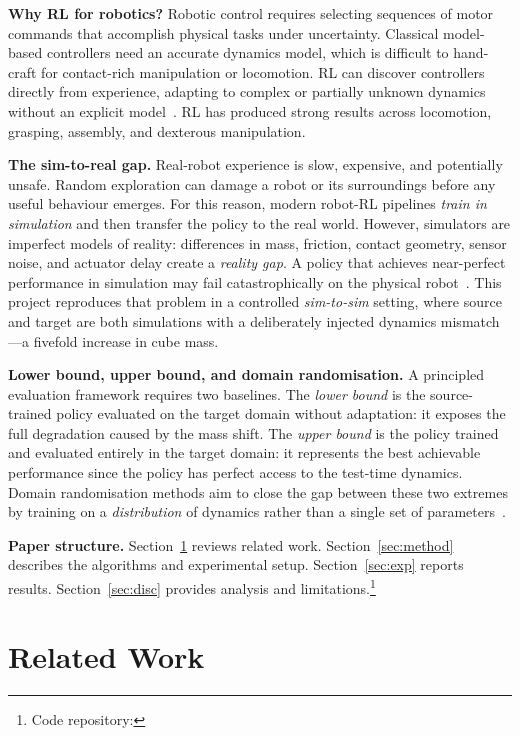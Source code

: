 \documentclass[10pt,twocolumn,letterpaper]{article}
\begin{document}
\textbf{Why RL for robotics?}
Robotic control requires selecting sequences of motor commands that accomplish physical tasks under uncertainty. Classical model-based controllers need an accurate dynamics model, which is difficult to hand-craft for contact-rich manipulation or locomotion. RL can discover controllers directly from experience, adapting to complex or partially unknown dynamics without an explicit model~\cite{kober2013robotics,kormushev2013applications}. RL has produced strong results across locomotion, grasping, assembly, and dexterous manipulation.

\textbf{The sim-to-real gap.}
Real-robot experience is slow, expensive, and potentially unsafe. Random exploration can damage a robot or its surroundings before any useful behaviour emerges. For this reason, modern robot-RL pipelines \emph{train in simulation} and then transfer the policy to the real world. However, simulators are imperfect models of reality: differences in mass, friction, contact geometry, sensor noise, and actuator delay create a \emph{reality gap}. A policy that achieves near-perfect performance in simulation may fail catastrophically on the physical robot~\cite{hofer2021perspectives,peng2018sim}. This project reproduces that problem in a controlled \emph{sim-to-sim} setting, where source and target are both simulations with a deliberately injected dynamics mismatch---a fivefold increase in cube mass.

\textbf{Lower bound, upper bound, and domain randomisation.}
A principled evaluation framework requires two baselines. The \emph{lower bound} is the source-trained policy evaluated on the target domain without adaptation: it exposes the full degradation caused by the mass shift. The \emph{upper bound} is the policy trained and evaluated entirely in the target domain: it represents the best achievable performance since the policy has perfect access to the test-time dynamics. Domain randomisation methods aim to close the gap between these two extremes by training on a \emph{distribution} of dynamics rather than a single set of parameters~\cite{tobin2017domain}.

\textbf{Paper structure.}
Section~\ref{sec:related} reviews related work. Section~\ref{sec:method} describes the algorithms and experimental setup. Section~\ref{sec:exp} reports results. Section~\ref{sec:disc} provides analysis and limitations.\footnote{Code repository: \repo}

\section{Related Work}
\label{sec:related}
\end{document}

